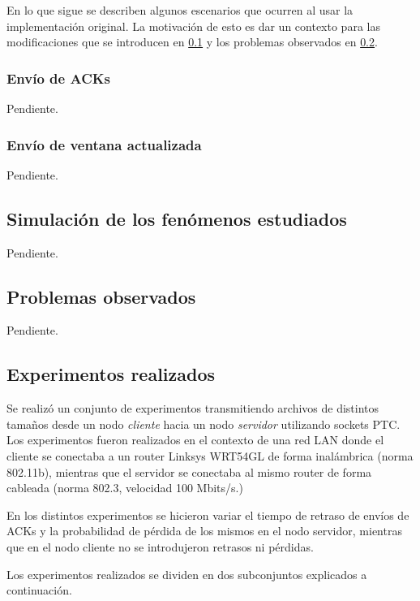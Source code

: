 \documentclass[a4paper, 10pt, twoside]{article}
\begin{document}
En lo que sigue se describen algunos escenarios que ocurren al usar la implementación original. La motivación de esto es dar un contexto para las modificaciones que se introducen en \ref{sec:simulacion-fenomenos} y los problemas observados en \ref{sec:problemas-observados}.


\subsubsection{Envío de ACKs}

Pendiente.


\subsubsection{Envío de ventana actualizada}

Pendiente.


\subsection{Simulación de los fenómenos estudiados}
\label{sec:simulacion-fenomenos}

Pendiente.


\subsection{Problemas observados}
\label{sec:problemas-observados}

Pendiente.



\subsection{Experimentos realizados}

Se realizó un conjunto de experimentos transmitiendo archivos de distintos tamaños desde un nodo \textit{cliente} hacia un nodo \textit{servidor} utilizando sockets PTC. Los experimentos fueron realizados en el contexto de una red LAN donde el cliente se conectaba a un router Linksys WRT54GL de forma inalámbrica (norma 802.11b), mientras que el servidor se conectaba al mismo router de forma cableada (norma 802.3, velocidad 100 Mbits/s.)

En los distintos experimentos se hicieron variar el tiempo de retraso de envíos de ACKs y la probabilidad de pérdida de los mismos en el nodo servidor, mientras que en el nodo cliente no se introdujeron retrasos ni pérdidas.

Los experimentos realizados se dividen en dos subconjuntos explicados a continuación.
\end{document}
